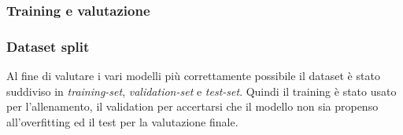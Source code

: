 



\subsubsection{Training e valutazione}

\subsubsection{Dataset split}

Al fine di valutare i vari modelli più correttamente possibile il dataset è
stato suddiviso in \textit{training-set}, \textit{validation-set} e
\textit{test-set}. Quindi il training è stato usato per l'allenamento, il
validation per accertarsi che il modello non sia propenso all'overfitting ed il
test per la valutazione finale.

